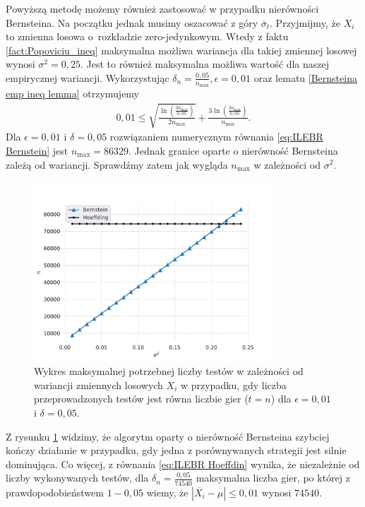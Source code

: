 \documentclass[inzynierska]{pwr_wmat_praca_dyplomowa}
\theoremstyle{plain}
\numberwithin{theorem}{chapter}
\theoremstyle{definition}
\numberwithin{theorem}{chapter}
\newcommand{\nmax}{n_{\text{max}}}
\begin{document}
	Powyższą metodę możemy również zastosować w przypadku nierówności Bernsteina.
	Na początku jednak musimy oszacować z góry $\overline{\sigma}_t$.
	Przyjmijmy, że $X_i$ to zmienna losowa o~rozkładzie zero-jedynkowym.
	Wtedy z faktu \ref{fact:Popoviciu_ineq} maksymalna możliwa wariancja dla takiej zmiennej losowej wynosi $\sigma^2 = 0,25$. Jest to również maksymalna możliwa wartość dla naszej empirycznej wariancji. Wykorzystując $\delta_{n} = \frac{0,05}{\nmax}, \epsilon = 0,01$ oraz lematu \ref{Bernsteina emp ineq lemma} otrzymujemy
	\begin{gather}
		\label{eq:ILEBR Bernstein}
		0,01 \le \sqrt{\frac{\ln(\frac{3\nmax}{0,05})}{2\nmax}} + \frac{3  \ln(\frac{3\nmax}{0,05})}{\nmax}.
	\end{gather}
	Dla $\epsilon=0,01$ i $\delta=0,05$ rozwiązaniem numerycznym równania \eqref{eq:ILEBR Bernstein} jest $\nmax=86329$. Jednak granice oparte o nierówność Bernsteina zależą od wariancji. Sprawdźmy zatem jak wygląda $\nmax$ w zależności od $\sigma^2$.
	\begin{figure}
		\centering
		\includegraphics[width=0.8\textwidth]{imagens/t_eq_n.pdf}
		\caption{Wykres maksymalnej potrzebnej liczby testów w zależności od wariancji zmiennych losowych  $X_i$ w przypadku, gdy liczba przeprowadzonych testów jest równa liczbie gier ($t = n$) dla $\epsilon=0,01$ i $\delta = 0,05$.}
		\label{fig:t_eq_n}
	\end{figure}
	Z rysunku \ref{fig:t_eq_n} widzimy, że algorytm oparty o nierówność Bernsteina szybciej kończy działanie w przypadku, gdy jedna z porównywanych strategii jest silnie dominująca. Co więcej, z równania \eqref{eq:ILEBR Hoeffdin} wynika, że niezależnie od liczby wykonywanych testów, dla $\delta_n = \frac{0,05}{74540}$ maksymalna liczba gier, po której z prawdopodobieństwem $1-0,05$ wiemy, że $|\overline{X_i} - \mu| \le 0,01$ wynosi $74540$. 
	
\end{document}
